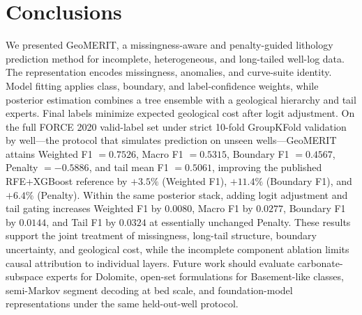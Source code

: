 \documentclass[bdcc,article,submit,pdftex,moreauthors]{Definitions/mdpi}
\begin{document}
\section{Conclusions}
\label{sec:conclusion}
We presented GeoMERIT, a missingness-aware and penalty-guided lithology prediction method for
incomplete, heterogeneous, and long-tailed well-log data. The representation encodes
missingness, anomalies, and curve-suite identity. Model fitting applies class, boundary, and
label-confidence weights, while posterior estimation combines a tree ensemble with a
geological hierarchy and tail experts. Final labels minimize expected geological cost after
logit adjustment. On the full FORCE 2020 valid-label set under strict
10-fold GroupKFold validation by well---the protocol that simulates prediction on unseen
wells---GeoMERIT attains Weighted F1 $=0.7526$, Macro F1 $=0.5315$, Boundary F1 $=0.4567$,
Penalty $=-0.5886$, and tail mean F1 $=0.5061$, improving the published RFE+XGBoost
reference by $+3.5\%$ (Weighted F1), $+11.4\%$ (Boundary F1), and $+6.4\%$ (Penalty).
Within the same posterior stack, adding logit adjustment and tail gating increases Weighted
F1 by $0.0080$, Macro F1 by $0.0277$, Boundary F1 by $0.0144$, and Tail F1 by $0.0324$ at
essentially unchanged Penalty. These results support the joint treatment of missingness,
long-tail structure, boundary uncertainty, and geological cost, while the incomplete
component ablation limits causal attribution to individual layers. Future work should evaluate
carbonate-subspace experts for Dolomite, open-set formulations for Basement-like classes,
semi-Markov segment decoding at bed scale, and foundation-model representations under the
same held-out-well protocol.

\vspace{6pt}





\end{document}
